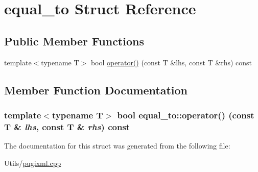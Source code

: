 \hypertarget{structequal__to}{
\section{equal\_\-to Struct Reference}
\label{structequal__to}
}
\subsection*{Public Member Functions}
\begin{CompactItemize}
\item 
template$<$typename T$>$ bool \hyperlink{structequal__to_7ac5ec43d004eea5e077a01265a1641f}{operator()} (const T \&lhs, const T \&rhs) const 
\end{CompactItemize}


\subsection{Member Function Documentation}
\hypertarget{structequal__to_7ac5ec43d004eea5e077a01265a1641f}{
\subsubsection[operator()]{\setlength{\rightskip}{0pt plus 5cm}template$<$typename T$>$ bool equal\_\-to::operator() (const T \& {\em lhs}, const T \& {\em rhs}) const}}
\label{structequal__to_7ac5ec43d004eea5e077a01265a1641f}




The documentation for this struct was generated from the following file:\begin{CompactItemize}
\item 
Utils/\hyperlink{pugixml_8cpp}{pugixml.cpp}\end{CompactItemize}
